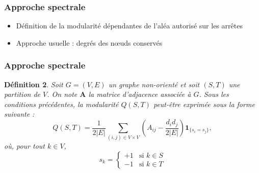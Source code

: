 \documentclass[c]{beamer}
\newtheorem*{deffr}{Définition}
\begin{document}
\begin{frame}
    \frametitle{Approche spectrale}
    \begin{itemize}
        \begin{deffr}
            Soit $G = (V, E)$ un graphe non-orienté et soit $(S, T)$ une
            partition de $V$. La modularité associée à la partition $(S, T)$
            correspond taux d'arrêtes de $E$ contenues dans $S$ ou $T$ comparé
            au taux d'arrêtes qui auraient été contenues dans $S$ ou $T$ si
            l'on avait distribué les arrêtes du graphe aléatoirement.
        \end{deffr}

        \item Définition de la modularité dépendantes de l'aléa autorisé sur
        les arrêtes
        \item Approche usuelle : degrés des n\oe{}uds conservés
    \end{itemize}

\end{frame}

\begin{frame}
    \frametitle{Approche spectrale}
    \begin{deffr}
        Soit $G = (V, E)$ un graphe non-orienté et soit $(S, T)$ une partition
        de $V$. On note $\mathbf{A}$ la matrice d'adjacence associée à $G$.
        Sous les conditions précédentes, la modularité $Q(S, T)$ peut-être
        exprimée sous la forme suivante :
        \[
            Q(S, T) = \frac{1}{2|E|} \sum_{(i, j) \in V \times V}
                \left( A_{ij} - \frac{d_i d_j}{2|E|} \right)
                \mathbf{1}_{\{s_i = s_j\}},
        \]
        où, pour tout $k \in V$,
        \[
            s_k = \left\{
                \begin{array}{ll}
                    +1 & \text{si $k \in S$} \\
                    -1 & \text{si $k \in T$}
                \end{array}
            \right.
        \]
    \end{deffr}

\end{frame}
\end{document}
